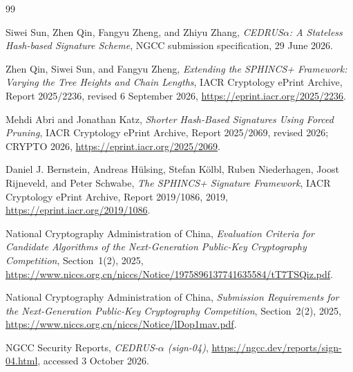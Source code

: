\documentclass[11pt,a4paper]{article}
\begin{document}
\begin{thebibliography}{99}
\small

Siwei Sun, Zhen Qin, Fangyu Zheng, and Zhiyu Zhang,
\emph{CEDRUS$\alpha$: A Stateless Hash-based Signature Scheme},
NGCC submission specification, 29 June 2026.

Zhen Qin, Siwei Sun, and Fangyu Zheng,
\emph{Extending the SPHINCS+ Framework: Varying the Tree Heights and Chain
Lengths}, IACR Cryptology ePrint Archive, Report 2025/2236, revised 6 September
2026,
\url{https://eprint.iacr.org/2025/2236}.

Mehdi Abri and Jonathan Katz,
\emph{Shorter Hash-Based Signatures Using Forced Pruning},
IACR Cryptology ePrint Archive, Report 2025/2069, revised 2026; CRYPTO 2026,
\url{https://eprint.iacr.org/2025/2069}.

Daniel J. Bernstein, Andreas H\"ulsing, Stefan K\"olbl, Ruben Niederhagen,
Joost Rijneveld, and Peter Schwabe,
\emph{The SPHINCS+ Signature Framework},
IACR Cryptology ePrint Archive, Report 2019/1086, 2019,
\url{https://eprint.iacr.org/2019/1086}.

National Cryptography Administration of China,
\emph{Evaluation Criteria for Candidate Algorithms of the Next-Generation
Public-Key Cryptography Competition}, Section~1(2), 2025,
\url{https://www.niccs.org.cn/niccs/Notice/1975896137741635584/tT7TSQiz.pdf}.

National Cryptography Administration of China,
\emph{Submission Requirements for the Next-Generation Public-Key
Cryptography Competition}, Section~2(2), 2025,
\url{https://www.niccs.org.cn/niccs/Notice/lDop1mav.pdf}.

NGCC Security Reports,
\emph{CEDRUS-$\alpha$ (sign-04)},
\url{https://ngcc.dev/reports/sign-04.html}, accessed 3 October 2026.

\end{thebibliography}
\end{document}
